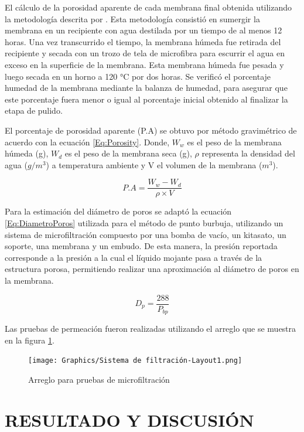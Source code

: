 \documentclass{article}
\begin{document}
El cálculo de la porosidad aparente de cada membrana final obtenida 
utilizando la metodología descrita por \parencite[p~122]{Purkait2018}. Esta metodología consistió en sumergir la membrana en un recipiente con agua destilada por un tiempo de al menos 12 horas. Una vez transcurrido el tiempo, la membrana húmeda fue retirada del recipiente y secada con un trozo de tela de microfibra para escurrir el agua en exceso en la superficie de la membrana. Esta membrana húmeda fue pesada y luego secada en un horno a 120 °C por dos horas. Se verificó el porcentaje humedad de la membrana mediante la balanza de humedad, para asegurar que este porcentaje fuera menor o igual al porcentaje inicial obtenido al finalizar la etapa de pulido. 

El porcentaje de porosidad aparente (P.A) se obtuvo por método 
gravimétrico de acuerdo con la ecuación \ref{Eq:Porosity}. 
Donde, $W_w$ es el peso de la membrana húmeda (g), $W_d$ es el peso 
de la membrana seca (g), $\rho$ representa la densidad del agua ($g/m^3$) 
a temperatura ambiente y V el volumen de la membrana ($m^3$).

\begin{equation}
    P.A = \frac{W_w-W_d}{\rho \times V}
    \label{Eq:Porosity}
\end{equation}

Para la estimación del diámetro de poros se adaptó la 
ecuación \ref{Eq:DiametroPoros} utilizada para el método de punto 
burbuja, utilizando un sistema de microfiltración compuesto por una 
bomba de vacío, un kitasato, un soporte, una membrana y un embudo. 
De esta manera, la presión reportada corresponde a la presión a la 
cual el líquido mojante pasa a través de la estructura porosa, 
permitiendo realizar una aproximación al diámetro de poros en la 
membrana. 

\begin{equation}
    D_p = \frac{288}{P_{bp}}
    \label{Eq:DiametroPoros}
\end{equation}

Las pruebas de permeación fueron realizadas utilizando el arreglo 
que se muestra en la figura \ref{fig:Arreglo_MF}. 

\begin{figure}[!htbp]
    \centering
    \texttt{[image: Graphics/Sistema de filtración-Layout1.png]}
    \caption{Arreglo para pruebas de microfiltración}
    \label{fig:Arreglo_MF}
\end{figure}

\section{RESULTADO Y DISCUSIÓN}
\end{document}

